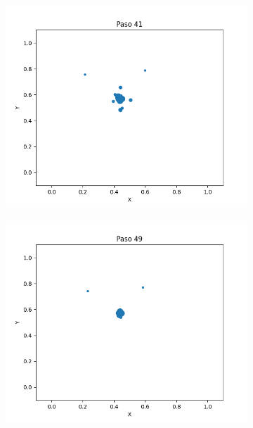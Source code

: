 \documentclass{report}
\begin{document}
\begin{figure}[h]
\begin{subfigure}[b]{0.3\textwidth}
         \includegraphics[width=\textwidth]{Images/Images_m/p9pm_t41.png}
     \end{subfigure}
     \begin{subfigure}[b]{0.3\textwidth}
         \centering
         \includegraphics[width=\textwidth]{Images/Images_m/p9pm_t49.png}
     \end{subfigure}
     \begin{subfigure}[b]{0.3\textwidth}
         \centering

\end{subfigure}
\end{figure}
\end{document}

